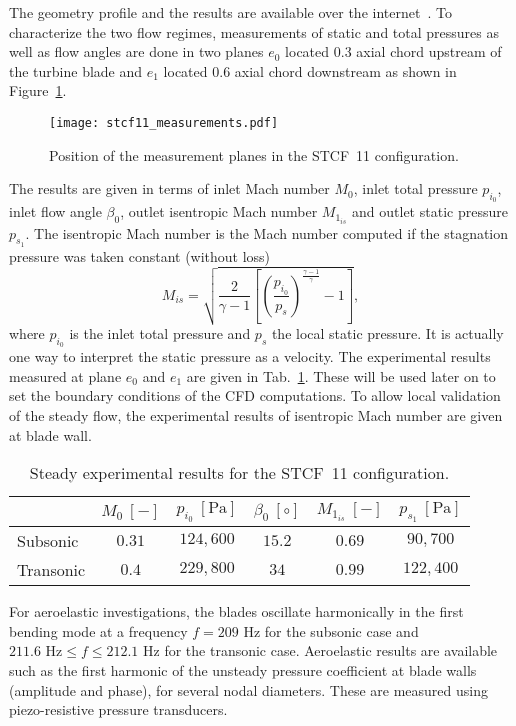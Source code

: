 The geometry profile and the results are available over the
internet~\cite{stcf11web}. 
To characterize the two flow regimes, measurements of static and total pressures 
as well as flow angles are done in two planes $e_0$ located $0.3$ axial chord upstream 
of the turbine
blade and $e_1$ located $0.6$ axial chord downstream
as shown in Figure~\ref{fig:stcf11_measurements}.
\begin{figure}[htp]
  \centering
  \texttt{[image: stcf11\_measurements.pdf]}
  \caption{Position of the measurement planes in the STCF~11 configuration.}
  \label{fig:stcf11_measurements}
\end{figure}
The results are given in terms of
inlet Mach number $M_0$, inlet total pressure $p_{i_0}$, 
inlet flow angle $\beta_0$, outlet isentropic
Mach number $M_{1_{is}}$ and outlet static pressure $p_{s_1}$. 
The isentropic Mach number is the Mach number 
computed if the stagnation pressure was taken constant (without loss)
\begin{equation}
    M_{is} = \sqrt{\frac{2}{\gamma -1}
        \left[\left( \frac{p_{i_0}}{p_s} \right)^{\frac{\gamma - 1}{\gamma}}  
        - 1 \right]},
\end{equation}
where $p_{i_0}$ is the inlet total pressure and $p_s$
the local static pressure.
It is actually
one way to interpret the static pressure as a velocity.
The experimental results measured at plane $e_0$
and $e_1$ are given in Tab.~\ref{tab:stcf11_steady_results}. 
These will be used later on to set the boundary conditions 
of the CFD computations. To allow local validation of the steady
flow, the experimental results of 
isentropic Mach number are given at blade wall.
\begin{table}[htp]
   \centering
  \begin{tabular}{lccccc}
    \toprule
    \phantom{abdefghijk}& $M_0~[-]$ & $p_{i_0}~[\text{Pa}]$ & $\beta_0~[\circ]$ & $M_{1_{is}}~[-]$ & $p_{s_1}~[\text{Pa}]$ \\
    \midrule
    Subsonic & $0.31$ & $124,600$ & $15.2$ & $0.69$  & $90,700$ \\
    Transonic & $0.4$ & $229,800$ & $34$    & $0.99$ & $122,400$ \\
    \bottomrule
  \end{tabular}
  \caption{Steady experimental results for the STCF~11 configuration.}
  \label{tab:stcf11_steady_results}
\end{table} 

For aeroelastic investigations, the blades oscillate 
harmonically in the first bending mode
at a frequency $f = 209 \textrm{ Hz}$
for the subsonic case and 
$211.6 \textrm{ Hz} \leq f \leq 212.1 \textrm{ Hz}$ for the
transonic case. Aeroelastic
results are available such as the first harmonic of the unsteady pressure
coefficient at blade walls (amplitude and phase), for several nodal
diameters. These are measured using piezo-resistive pressure transducers.

